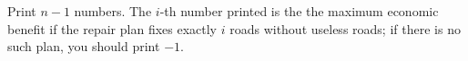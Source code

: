 Print $n-1$ numbers. The $i$-th number printed is the
the maximum economic benefit if the repair plan fixes 
exactly $i$ roads without useless roads;
if there is no such plan, you should print $-1$.

